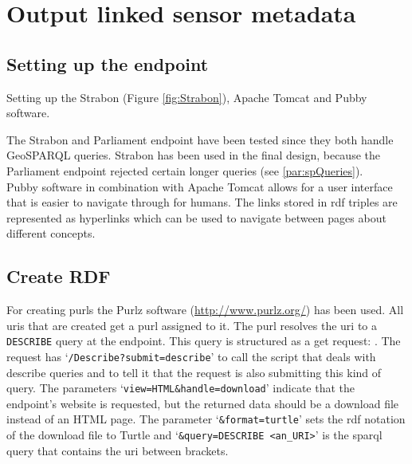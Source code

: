 

\section{Output linked sensor metadata}
\label{par:publishLD}

\subsection{Setting up the endpoint}
Setting up the Strabon (Figure \ref{fig:Strabon}), Apache Tomcat and Pubby software. 

The Strabon and Parliament endpoint have been tested since they both handle GeoSPARQL queries. Strabon has been used in the final design, because the Parliament endpoint rejected certain longer queries (see \ref{par:spQueries}). \\

Pubby software in combination with Apache Tomcat allows for a user interface that is easier to navigate through for humans. The links stored in \ac{rdf} triples are represented as hyperlinks which can be used to navigate between pages about different concepts. \\

\subsection{Create RDF}
For creating \aclp{purl} the Purlz software (\url{http://www.purlz.org/}) has been used. All \acp{uri} that are created get a \ac{purl} assigned to it. The \ac{purl} resolves the \ac{uri} to a \texttt{DESCRIBE} query at the endpoint. This query is structured as a get request: \texttt{}. The request has `\texttt{/Describe?submit=describe}' to call the script that deals with describe queries and to tell it that the request is also submitting this kind of query. The parameters `\texttt{view=HTML\&handle=download}' indicate that the endpoint's website is requested, but the returned data should be a download file instead of an HTML page. The parameter `\texttt{\&format=turtle}' sets the \ac{rdf} notation of the download file to Turtle and `\texttt{\&query=DESCRIBE <an\_URI>}' is the \ac{sparql} query that contains the \ac{uri} between brackets. 

